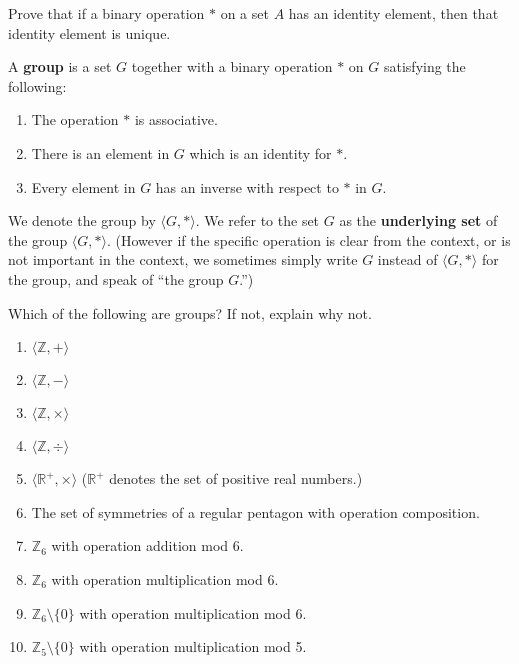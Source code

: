 \begin{problem}
Prove that if a binary operation \(*\) on a set \(A\) has an identity element, then that identity element is unique.
\end{problem}

\begin{definition}
A \textbf{group} is a set \(G\) together with a binary operation \(*\) on \(G\) satisfying the following:
\begin{enumerate}
  \item The operation \(*\) is associative.
  \item There is an element in \(G\) which is an identity for \(*\).
  \item Every element in \(G\) has an inverse with respect to \(*\) in \(G\).
\end{enumerate}
We denote the group by \(\langle G, * \rangle\). We refer to the set \(G\) as the \textbf{underlying set} of the group \(\langle G, * \rangle\). (However if the specific operation is clear from the context, or is not important in the context, we sometimes simply write \(G\) instead of \(\langle G, * \rangle\) for the group, and speak of ``the group \(G\).'')
\end{definition}

\begin{problem}\label{prob:groupex}
Which of the following are groups? If not, explain why not.
\begin{enumerate}
  \item  \(\langle \mathbb{Z}, + \rangle\)
  \item  \(\langle \mathbb{Z}, - \rangle\)
  \item  \(\langle \mathbb{Z}, \times \rangle\)
  \item  \(\langle \mathbb{Z}, \div \rangle\)
  \item  \(\langle \mathbb{R}^+, \times \rangle\) (\(\mathbb{R}^+\) denotes the set of positive real numbers.)
  \item  The set of symmetries of a regular pentagon with operation composition.
  \item  \(\mathbb{Z}_6\) with operation addition mod 6.
  \item  \(\mathbb{Z}_6\) with operation multiplication mod 6.
  \item  \(\mathbb{Z}_6 \setminus \{0\}\) with operation multiplication mod 6.
  \item  \(\mathbb{Z}_5 \setminus \{0\}\) with operation multiplication mod 5.
\end{enumerate}
\end{problem}

